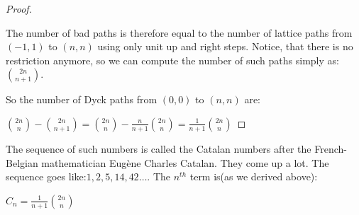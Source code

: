 \begin{proof}
\begin{figure}
    \end{figure}
The number of bad paths is therefore equal to the number of lattice paths from $(-1, 1)$ to $(n, n)$ using only unit up and right steps.  Notice, that there is no restriction anymore, so we can compute the number of such paths simply as: $\binom{2n}{n+1}$.\par
So the number of Dyck paths from $(0,0)$ to $(n,n)$ are:\par
$\binom{2n}{n} - \binom{2n}{n+1} = \binom{2n}{n} - \frac{n}{n+1} \binom{2n}{n} = \frac{1}{n+1} \binom{2n}{n}$
\end{proof}
The sequence of such numbers is called the Catalan numbers after the French-Belgian mathematician Eugène Charles Catalan. They come up a lot. The sequence goes like:$1, 2, 5, 14, 42 \dots$. The $n^{th}$ term is(as we derived above):
\begin{theorem}
    $C_n=\frac{1}{n+1} \binom{2n}{n}$
\end{theorem}
